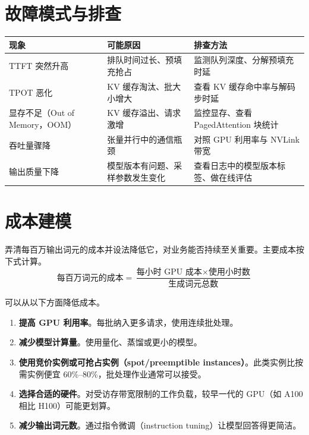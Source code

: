 \section{故障模式与排查}

\begin{center}
\begin{tabularx}{.94\linewidth}{
  @{}>{\raggedright\arraybackslash}p{.23\linewidth}
  >{\raggedright\arraybackslash}X
  >{\raggedright\arraybackslash}X@{}
}
\toprule
\textbf{现象} & \textbf{可能原因} & \textbf{排查方法} \\
\midrule
TTFT 突然升高 & 排队时间过长、预填充抢占 & 监测队列深度、分解预填充时延 \\
TPOT 恶化 & KV 缓存淘汰、批大小增大 & 查看 KV 缓存命中率与解码步时延 \\
显存不足（Out of Memory，OOM） & KV 缓存溢出、请求激增 & 监控显存、查看 PagedAttention 块统计 \\
吞吐量骤降 & 张量并行中的通信瓶颈 & 对照 GPU 利用率与 NVLink 带宽 \\
输出质量下降 & 模型版本有问题、采样参数发生变化 & 查看日志中的模型版本标签、做在线评估 \\
\bottomrule
\end{tabularx}
\end{center}

\section{成本建模}

弄清每百万输出词元的成本并设法降低它，对业务能否持续至关重要。主要成本按下式计算。
\[
\text{每百万词元的成本}
=\frac{\text{每小时 GPU 成本}\times\text{使用小时数}}{\text{生成词元总数}}
\]

可以从以下方面降低成本。
\begin{enumerate}
  \item \textbf{提高 GPU 利用率}。每批纳入更多请求，使用连续批处理。
  \item \textbf{减少模型计算量}。使用量化、蒸馏或更小的模型。
  \item \textbf{使用竞价实例或可抢占实例（spot/preemptible instances）}。此类实例比按需实例便宜 60\%–80\%，批处理作业通常可以接受。
  \item \textbf{选择合适的硬件}。对受访存带宽限制的工作负载，较早一代的 GPU（如 A100 相比 H100）可能更划算。
  \item \textbf{减少输出词元数}。通过指令微调（instruction tuning）让模型回答得更简洁。
\end{enumerate}

